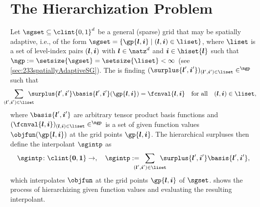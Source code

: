 \section{The Hierarchization Problem}
\label{sec:41problem}

Let $\sgset \subset \clint{0, 1}^d$ be a general (sparse) grid that
may be spatially adaptive, i.e.,
of the form $\sgset = \{\gp{\*l,\*i} \mid (\*l, \*i) \in \liset\}$,
where $\liset$ is a set of level-index pairs $({\boldsymbol{l}}, {\boldsymbol{i}})$ with $\*l \in \natz^d$
and $\*i \in \hiset{\*l}$ such that
$\ngp := \setsize{\sgset} = \setsize{\liset} < \infty$
(see \cref{sec:233spatiallyAdaptiveSG}).
The  is finding
$(\surplus{\*l',\*i'})_{(\*l',\*i') \in \liset} \in \real^{\ngp}$ such that
\begin{equation}
  \label{eq:hierarchizationProblem}
  \largesum{(\*l', \*i') \in \liset} \surplus{\*l',\*i'}
  \basis{\*l',\*i'}(\gp{\*l,\*i}) = \fcnval{\*l,\*i}
  \quad\text{for all}\quad
  (\*l, \*i) \in \liset,
\end{equation}
where $\basis{\*l',\*i'}$ are arbitrary tensor product basis functions and
$(\fcnval{\*l,\*i})_{(\*l,\*i) \in \liset} \in \real^{\ngp}$ is a set of
given function values $\objfun(\gp{\*l,\*i})$
at the grid points $\gp{\*l,\*i}$.
The hierarchical surpluses then define the interpolant $\sgintp$ as
\begin{equation}
  \label{eq:hierarchizationInterpolant}
  \sgintp\colon \clint{\*0, \*1} \to \real,\quad
  \sgintp :=
  \largesum{(\*l', \*i') \in \liset} \surplus{\*l',\*i'}
  \basis{\*l',\*i'},
\end{equation}
which interpolates $\objfun$ at the grid points $\gp{\*l,\*i}$ of $\sgset$.
 shows the process of hierarchizing given
function values and evaluating the resulting interpolant.

